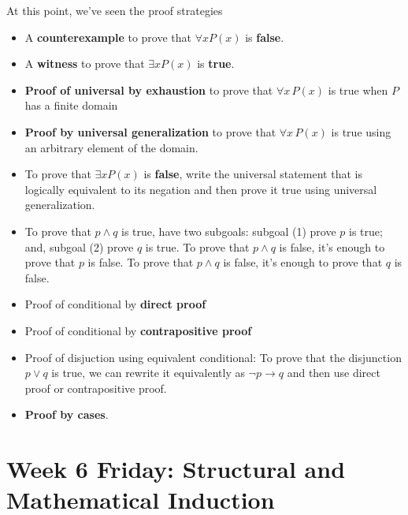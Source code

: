 At this point, we've seen the proof strategies
\begin{multicols}{2}
    \begin{itemize}
        \item A {\bf counterexample} to prove that  $\forall x P(x)$ is {\bf false}.
        \item  A {\bf witness} to prove that  $\exists x P(x)$ is {\bf true}.
        \item {\bf Proof of universal by exhaustion} to prove that $\forall x \, P(x)$
    is true when $P$ has a finite domain
        \item  {\bf Proof by universal generalization} to prove that $\forall x \, P(x)$
    is true using an arbitrary element of the domain.
        \item To  prove  that $\exists x P(x)$ is {\bf false}, write the universal statement that is 
        logically equivalent to its negation and then prove it true using universal generalization.
        \item To prove that $p \land q$ is true, have two subgoals: 
        subgoal (1) prove $p$ is  true; and, subgoal (2) prove $q$ is true. To prove that $p \land q$ is false, it's enough to prove that $p$ is false.
     To prove that $p \land q$ is false, it's enough to prove that $q$ is false.
        \item Proof of conditional by {\bf direct proof}
        \item Proof of conditional by {\bf contrapositive proof}
        \item Proof of disjuction using equivalent conditional: To prove that the 
        disjunction $p \lor q$ is true, we can rewrite it equivalently as $\lnot p \to q$ and
        then use direct proof or contrapositive proof.
        \item {\bf Proof by cases}.
    \end{itemize}
\end{multicols}
\newpage

\newpage


\newpage

\newpage

\section*{Week 6 Friday: Structural and Mathematical Induction}


\newpage

\vfill

\newpage


